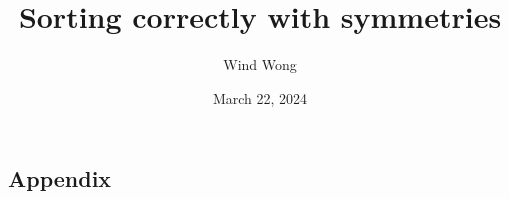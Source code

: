 \documentclass{l4proj}
\begin{document}
\title{Sorting correctly with symmetries}
\author{Wind Wong}
\date{March 22, 2024}

\maketitle

\begin{abstract}
    
\end{abstract}


%
%
\def\consentname {Tsz Fung Wind Wong} %
\def\consentdate {18 March 2024} %
%
\educationalconsent


\tableofcontents

\begin{toappendix}
  \chapter{Appendix}
\end{toappendix}
\end{document}
